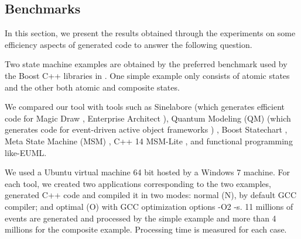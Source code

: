 \subsection{Benchmarks}
\label{subsec:exp3}
In this section, we present the results obtained through the experiments on some efficiency aspects of generated code to answer the following question.



\begin{mdframed}[backgroundcolor=blue!5]
\small
{} 
\end{mdframed}
Two state machine examples are obtained by the preferred benchmark used by the Boost C++ libraries \cite{boost} in \cite{benchmark}. One simple example only consists of atomic states and the other both atomic and composite states. 

We compared our tool with tools such as Sinelabore (which generates efficient code for Magic Draw \cite{Magicdraw}, Enterprise Architect \cite{EA}), Quantum Modeling (QM) \cite{qm} (which generates code for event-driven active object frameworks \cite{Lavender1996})%
, Boost Statechart \cite{Statechart}, Meta State Machine (MSM) \cite{MSM}, C++ 14 MSM-Lite \cite{benchmark}, and functional programming like-EUML\cite{EUML}. 

We used a Ubuntu virtual machine 64 bit hosted by a Windows 7 machine. 
For each tool, we created two applications corresponding to the two examples, generated C++ code and compiled it in two modes: normal (N), by default GCC compiler; and optimal (O) with GCC optimization options -O2 -s. 
11 millions of events are generated and processed by the simple example and more than 4 millions for the composite example. 
Processing time is measured for each case. 

